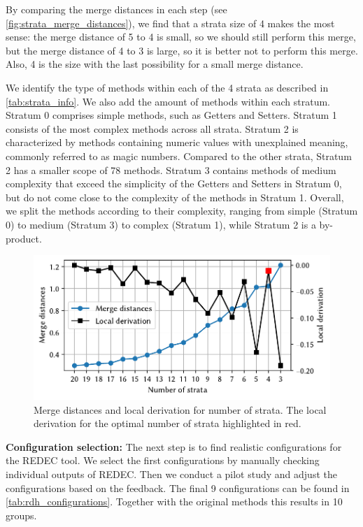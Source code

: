 \documentclass[%
class=scrreprt,
chapterprefix=false,%
open=right,%
twoside=false,%
paper=a4,%
logofile={Logo\_zentral\_farbig\_EN.png},%
thesistype=master,%
UKenglish,%
]{se2thesis}
\theoremstyle{definition}
\newcommand{\rdh}{REDEC\xspace}
\begin{document}
	By comparing the merge distances in each step (see \autoref{fig:strata_merge_distances}), we find that a strata size of 4 makes the most sense: the merge distance of 5 to 4 is small, so we should still perform this merge, but the merge distance of 4 to 3 is large, so it is better not to perform this merge. Also, 4 is the size with the last possibility for a small merge distance.
	
	We identify the type of methods within each of the 4 strata as described in \autoref{tab:strata_info}. We also add the amount of methods within each stratum. 
	Stratum 0 comprises simple methods, such as Getters and Setters. Stratum 1 consists of the most complex methods across all strata. 
	Stratum 2 is characterized by methods containing numeric values with unexplained meaning, commonly referred to as magic numbers. Compared to the other strata, Stratum 2 has a smaller scope of 78 methods. 
	Stratum 3 contains methods of medium complexity that exceed the simplicity of the Getters and Setters in Stratum 0, but do not come close to the complexity of the methods in Stratum 1. 
	Overall, we split the methods according to their complexity, ranging from simple (Stratum 0) to medium (Stratum 3) to complex (Stratum 1), while Stratum 2 is a by-product.
	
	\begin{figure}[tb]
		\centering
		\includegraphics[width=\textwidth]{img/strata_merge_distances.pdf}
		\caption{Merge distances and local derivation for number of strata. The local derivation for the optimal number of strata highlighted in red.} 
		\label{fig:strata_merge_distances}
	\end{figure}
	
	\textbf{Configuration selection:} The next step is to find realistic configurations for the \rdh tool. We select the first configurations by manually checking individual outputs of \rdh. Then we conduct a pilot study and adjust the configurations based on the feedback.
	The final 9 configurations can be found in \autoref{tab:rdh_configurations}. Together with the original methods this results in 10 groups.
	
\end{document}
